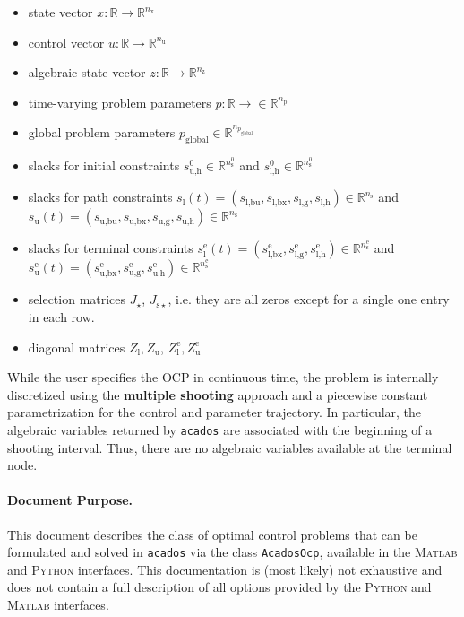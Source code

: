 \documentclass[english]{article}
\newcommand{\acados}{\texttt{acados}}
\newcommand{\matlab}{\textsc{Matlab}}
\newcommand{\python}{\textsc{Python}}
\newcommand{\ind}[1]{_{\textrm{#1}}}
\newcommand{\terminal}{^{\textrm{e}}}
\newcommand{\initial}{^{\textrm{0}}}
\newcommand{\glob}{_{\textrm{global}}}
\newcommand{\Lower}{\ind{l}}
\newcommand{\lowerh}{\ind{l,h}}
\newcommand{\lowerbx}{\ind{l,bx}}
\newcommand{\lowerbu}{\ind{l,bu}}
\newcommand{\lowerg}{\ind{l,g}}
\newcommand{\upper}{\ind{u}}
\newcommand{\upperh}{\ind{u,h}}
\newcommand{\upperbx}{\ind{u,bx}}
\newcommand{\upperbu}{\ind{u,bu}}
\newcommand{\upperg}{\ind{u,g}}
\newcommand{\R}{\mathbb{R}}
\newcommand{\nx}{n\ind{x}}
\newcommand{\nuu}{n\ind{u}}
\newcommand{\nz}{n\ind{z}}
\newcommand{\np}{n\ind{p}}
\newcommand{\ns}{n\ind{s}}
\begin{document}
\begin{itemize}
\item state vector $ x: \R \rightarrow \R^{\nx} $
\item control vector $ u: \R \rightarrow \R^{\nuu} $
\item algebraic state vector $ z: \R \rightarrow \R^{\nz} $
\item time-varying problem parameters $ p: \R \rightarrow \in \R^{\np}$
\item global problem parameters $p\glob  \in \R^{n_{p\glob}}$
\item slacks for initial constraints $s\ind{u,h}\initial \in \R^{\ns\initial}$ and $s\ind{l,h}\initial \in \R^{\ns\initial}$
\item slacks for path constraints $ s\Lower(t) = (s\lowerbu, s\lowerbx, s\lowerg, s\lowerh) \in \R^{\ns} $ and $ s\upper(t) = (s\upperbu, s\upperbx, s\upperg, s\upperh) \in \R^{\ns} $
\item slacks for terminal constraints $ s\Lower\terminal(t) = (s\lowerbx\terminal, s\lowerg\terminal, s\lowerh\terminal) \in \R^{\ns\terminal} $ and $ s\upper\terminal(t) = (s\upperbx\terminal, s\upperg\terminal, s\upperh\terminal) \in \R^{\ns\terminal} $
\item selection matrices $J_{\star}$, $J_{\mathrm{s}\star}$, i.e. they are all zeros except for a single one entry in each row.
\item diagonal matrices $Z\ind{l}, Z\ind{u}$, $Z\ind{l}\terminal, Z\ind{u}\terminal$
\end{itemize}

While the user specifies the OCP in continuous time, the problem is internally discretized using the \textbf{multiple shooting} approach and a piecewise constant parametrization for the control and parameter trajectory.
In particular, the algebraic variables returned by \acados{} are associated with the beginning of a shooting interval.
Thus, there are no algebraic variables available at the terminal node.

%

%
\paragraph{Document Purpose.}
This document describes the class of optimal control problems that can be formulated and solved in \acados{} via the class \texttt{AcadosOcp}, available in the \matlab{} and \python{} interfaces.
This documentation is (most likely) not exhaustive and does not contain a full description of all options provided by the \python{} and \matlab{} interfaces.
\end{document}
